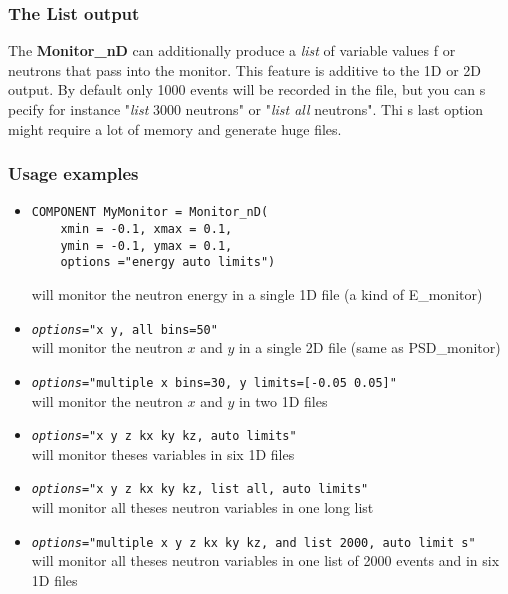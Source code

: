 \documentclass[12pt]{report}
\begin{document}
\subsubsection{The List output}

The {\bf Monitor\_nD} can additionally produce a {\it list} of variable values f
or neutrons that pass into the monitor. This feature is additive to the 1D or 2D
 output. By default only 1000 events will be recorded in the file, but you can s
pecify for instance "{\it list} 3000 neutrons" or "{\it list all} neutrons". Thi
s last option might require a lot of memory and generate huge files.

\subsubsection{Usage examples}

\begin{itemize}
\item{
\begin{verbatim}
COMPONENT MyMonitor = Monitor_nD( 
    xmin = -0.1, xmax = 0.1, 
    ymin = -0.1, ymax = 0.1, 
    options ="energy auto limits")
\end{verbatim}
will monitor the neutron energy in a single 1D file (a kind of E\_monitor)}
\item{\texttt{{\it options}="x y, all bins=50"} \\
will monitor the neutron $x$ and $y$ in a single 2D file (same as PSD\_monitor)}

\item{\texttt{{\it options}="multiple x bins=30, y limits=[-0.05 0.05]"} \\
will monitor the neutron $x$ and $y$ in two 1D files}
\item{\texttt{{\it options}="x y z kx ky kz,  auto limits"} \\
will monitor theses variables in six 1D files}
\item{\texttt{{\it options}="x y z kx ky kz, list all, auto limits"} \\
will monitor all theses neutron variables in one long list}
\item{\texttt{{\it options}="multiple x y z kx ky kz, and list 2000,  auto limit
s"} \\
will monitor all theses neutron variables in one list of 2000 events and in six 
1D files}
\end{itemize}


\end{document}

